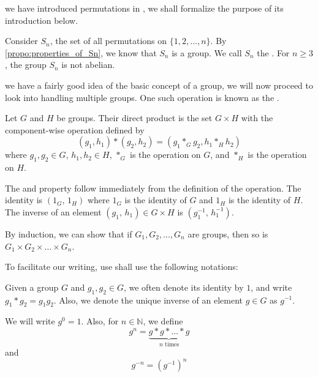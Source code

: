 \documentclass[notoc,notitlepage]{tufte-book}
\begin{document}
 we have introduced permutations in , we shall formalize the purpose of its introduction below.

\begin{eg}
  Consider $S_n$, the set of all permutations on $\{1, 2, ..., n\}$. By \cref{propo:properties_of_Sn}, we know that $S_n$ is a group. We call $S_n$ the  . For $n \geq 3$, the group $S_n$ is not abelian.
\end{eg}

 we have a fairly good idea of the basic concept of a group, we will now proceed to look into handling multiple groups. One such operation is known as the .

\begin{eg}
  \label{eg:direct_product}
  Let $G$ and $H$ be groups. Their direct product is the set $G \times H$ with the component-wise operation defined by
  \begin{equation*}
    (g_1, h_1) * (g_2, h_2) = (g_1 *_G g_2, h_1 *_H h_2)
  \end{equation*}
  where $g_1, g_2 \in G$, $h_1, h_2 \in H$, $*_G$ is the operation on $G$, and $*_H$ is the operation on $H$.

  The  and  property follow immediately from the definition of the operation. The identity is $(1_G, \, 1_H)$ where $1_G$ is the identity of $G$ and $1_H$ is the identity of $H$. The inverse of an element $(g_1, \, h_1) \in G \times H$ is $(g_1^{-1}, \, h_1^{-1})$.
\end{eg}

By induction, we can show that if $G_1, G_2, ..., G_n$ are groups, then so is $G_1 \times G_2 \times \hdots \times G_n$.

To facilitate our writing, use shall use the following notations:

\begin{notation}
  Given a group $G$ and $g_1, g_2 \in G$, we often denote its identity by $1$, and write $g_1 * g_2 = g_1 g_2$. Also, we denote the unique inverse of an element $g \in G$ as $g^{-1}$.

  We will write $g^0 = 1$. Also, for $n \in \mathbb{N}$, we define
  \begin{equation*}
     g^n = \underbrace{g * g * \hdots * g}_{n \text{ times}}
  \end{equation*}
  and
  \begin{equation*}
    g^{-n} = (g^{-1})^n
  \end{equation*}
\end{notation}
\end{document}
